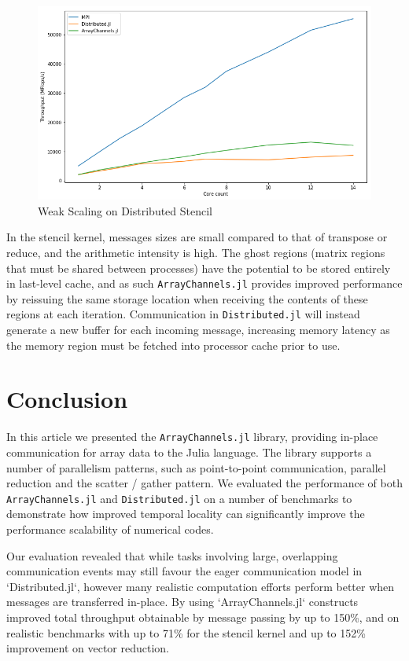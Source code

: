 \documentclass{juliacon}
\begin{document}
\begin{figure}[htb]
	\includegraphics[width=\linewidth]{figs/stencil.png}
	\caption{Weak Scaling on Distributed Stencil}
	\label{fig:plot-stencil}
\end{figure}

In the stencil kernel, messages sizes are small compared to that of
transpose or reduce, and the arithmetic intensity is high. The ghost
regions (matrix regions that must be shared between processes) have the
potential to be stored entirely in last-level cache, and as such
\texttt{ArrayChannels.jl} provides improved performance by reissuing the
same storage location when receiving the contents of these regions at
each iteration. Communication in \texttt{Distributed.jl} will instead
generate a new buffer for each incoming message, increasing memory
latency as the memory region must be fetched into processor cache prior
to use.


\section{Conclusion}
In this article we presented the \texttt{ArrayChannels.jl} library, providing in-place communication for array data to the Julia language. The library supports a number of parallelism patterns, such as point-to-point communication, parallel reduction and the scatter / gather pattern. We evaluated the performance of both \texttt{ArrayChannels.jl} and \texttt{Distributed.jl} on a number of benchmarks to demonstrate how improved temporal locality can significantly improve the performance scalability of numerical codes.

Our evaluation revealed that while tasks involving large, overlapping communication events may still favour the eager communication model in `Distributed.jl`, however many realistic computation efforts perform better when messages are transferred in-place. By using `ArrayChannels.jl` constructs improved total throughput obtainable by message passing by up to 150\%, and on realistic benchmarks with up to 71\% for the stencil kernel and up to 152\% improvement on vector reduction.


\end{document}
